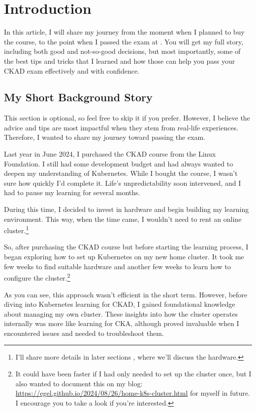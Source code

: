 
\section{Introduction}

In this article, I will share my journey from the moment when I planned to buy the course, to the point when I passed the exam at . You will get my full story, including both good and not-so-good decisions, but most importantly, some of the best tips and tricks that I learned and how those can help you pass your CKAD exam effectively and with confidence.

\subsection{My Short Background Story}
This section is optional, so feel free to skip it if you prefer. However, I believe the advice and tips are most impactful when they stem from real-life experiences. Therefore, I wanted to share my journey toward passing the exam.

Last year in June 2024, I purchased the CKAD course from the Linux Foundation. I still had some development budget and had always wanted to deepen my understanding of Kubernetes. While I bought the course, I wasn't sure how quickly I'd complete it. Life's unpredictability soon intervened, and I had to pause my learning for several months.

During this time, I decided to invest in hardware and begin building my learning environment. This way, when the time came, I wouldn't need to rent an online cluster.\footnote{I'll share more details in later sections , where we'll discuss the hardware.}

So, after purchasing the CKAD course but before starting the learning process, I began exploring how to set up Kubernetes on my new home cluster. It took me few weeks to find suitable hardware and another few weeks to learn how to configure the cluster.\footnote{It could have been faster if I had only needed to set up the cluster once, but I also wanted to document this on my blog: \url{https://egel.github.io/2024/08/26/home-k8s-cluster.html} for myself in future. I encourage you to take a look if you're interested.}

As you can see, this approach wasn't efficient in the short term. However, before diving into Kubernetes learning for CKAD, I gained foundational knowledge about managing my own cluster. These insights into how the cluster operates internally was more like learning for CKA, although proved invaluable when I encountered issues and needed to troubleshoot them.


